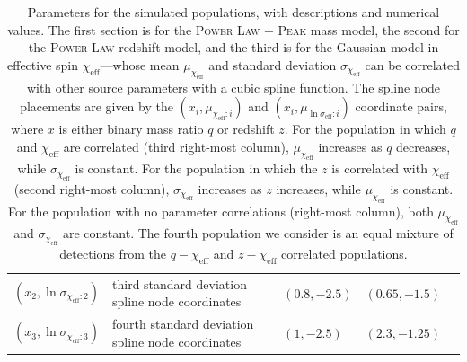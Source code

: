 \begin{refsection}
\begin{table}
{\begin{tabular}{lllll}
$(x_2, \ln\sigma_{\chi_\mathrm{eff}:2})$ & third standard deviation spline node coordinates & $(0.8, -2.5)$ & $(0.65, -1.5)$ &\\
$(x_3, \ln\sigma_{\chi_\mathrm{eff}:3})$ & fourth standard deviation spline node coordinates & $(1, -2.5)$ & $(2.3, -1.25)$ &\\
\hline\hline
\end{tabular}}
\caption{Parameters for the simulated populations, with descriptions and numerical values. The first section is for the \textsc{Power Law + Peak} mass model, the second for the \textsc{Power Law} redshift model, and the third is for the Gaussian model in effective spin $\chi_\mathrm{eff}$---whose mean $\mu_{\chi_\mathrm{eff}}$ and standard deviation $\sigma_{\chi_\mathrm{eff}}$ can be correlated with other source parameters with a cubic spline function. The spline node placements are given by the $(x_i, \mu_{\chi_\mathrm{eff}:i})$ and $(x_i, \mu_{\ln\sigma_\mathrm{eff}:i})$ coordinate pairs, where $x$ is either binary mass ratio $q$ or redshift $z$. For the population in which $q$ and $\chi_\mathrm{eff}$ are correlated (third right-most column), $\mu_{\chi_\mathrm{eff}}$ increases as $q$ decreases, while $\sigma_{\chi_\mathrm{eff}}$ is constant. For the population in which the $z$ is correlated with $\chi_\mathrm{eff}$ (second right-most column), $\sigma_{\chi_\mathrm{eff}}$ increases as $z$ increases, while $\mu_{\chi_\mathrm{eff}}$ is constant. For the population with no parameter correlations (right-most column), both $\mu_{\chi_\mathrm{eff}}$ and $\sigma_{\chi_\mathrm{eff}}$ are constant. The fourth population we consider is an equal mixture of detections from the $q-\chi_\mathrm{eff}$ and $z-\chi_\mathrm{eff}$ correlated populations.
}
\label{tab:true_hyper}
\end{table}


\end{refsection}
